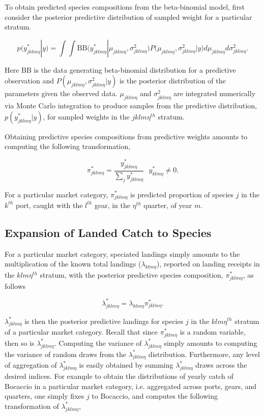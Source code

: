 \documentclass[12pt]{article}
\begin{document}
To obtain predicted species compositions from the beta-binomial model, first 
consider the posterior predictive distribution of sampled weight for a 
particular stratum.

\[p(y^*_{jklm\eta}|y) = \int\!\!\!\!\int\! \text{BB}\Big( y^*_{jklm\eta}|\mu_{jklm\eta}, \sigma^2_{jklm\eta} \Big) P\Big(\mu_{jklm\eta}, \sigma^2_{jklm\eta} | y\Big) d\mu_{jklm\eta} d\sigma^2_{jklm\eta}.\]

Here BB is the data generating beta-binomial distribution for a
predictive observation and \(P(\mu_{jklm\eta}, \sigma^2_{jklm\eta}|y)\)
is the posterior distribution of the parameters given the observed data.
\(\mu_{jklm\eta}\) and \(\sigma^2_{jklm\eta}\) are integrated numerically via 
Monte Carlo integration to produce samples from the predictive distribution, 
\(p(y^*_{jklm\eta}|y)\), for sampled weights in the \(jklm\eta^{th}\) stratum.

Obtaining predictive species compositions from predictive weights
amounts to computing the following transformation,

\[\pi^*_{jklm\eta} = \frac{y^*_{jklm\eta}}{\sum_j y^*_{jklm\eta}} ~~~ y^*_{klm\eta}\neq 0.\]

For a particular market category, \(\pi^*_{jklm\eta}\) is predicted
proportion of species \(j\) in the \(k^{th}\) port, caught with the
\(l^{th}\) gear, in the \(\eta^{th}\) quarter, of year \(m\).

\subsection{Expansion of Landed Catch to Species}\label{expansion}

For a particular market category, speciated landings simply amounts to
the multiplication of the known total landings (\(\lambda_{klm\eta}\)),
reported on landing receipts in the \(klm\eta^{th}\) stratum, with the
posterior predictive species composition, \(\pi^*_{jklm\eta}\), as follows

\[\lambda^*_{jklm\eta} = \lambda_{klm\eta}\pi^*_{jklm\eta}.\]

\(\lambda^*_{jklm\eta}\) is then the posterior predictive landings for
species \(j\) in the \(klm\eta^{th}\) stratum of a particular market
category. Recall that since \(\pi^*_{jklm\eta}\) is a random variable,
then so is \(\lambda^*_{jklm\eta}\). Computing the variance of
\(\lambda^*_{jklm\eta}\) simply amounts to computing the variance of
random draws from the \(\lambda^*_{jklm\eta}\) distribution.
Furthermore, any level of aggregation of \(\lambda^*_{jklm\eta}\) is
easily obtained by summing \(\lambda^*_{jklm\eta}\) draws across the
desired indices. For example to obtain the distributions of yearly catch
of Bocaccio in a particular market category, i.e. aggregated across ports, 
gears, and quarters, one simply fixes $j$ to Bocaccio, and computes the 
following transformation of \(\lambda^*_{jklm\eta}\),
\end{document}
